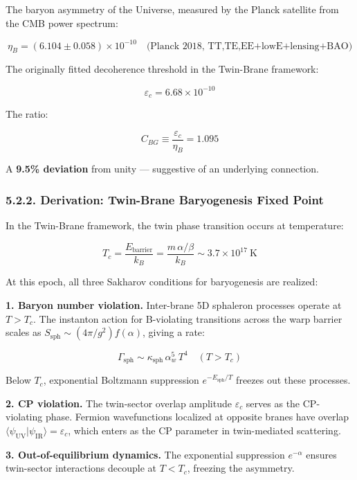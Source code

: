 \documentclass[
  11pt,
]{article}
\begin{document}
The baryon asymmetry of the Universe, measured by the Planck satellite
from the CMB power spectrum:

\[\eta_B = (6.104 \pm 0.058) \times 10^{-10} \quad \text{(Planck 2018, TT,TE,EE+lowE+lensing+BAO)} \tag{209}\]

The originally fitted decoherence threshold in the Twin-Brane framework:

\[\varepsilon_c = 6.68 \times 10^{-10} \tag{210}\]

The ratio:

\[C_{BG} \equiv \frac{\varepsilon_c}{\eta_B} = 1.095 \tag{211}\]

A \textbf{9.5\% deviation} from unity --- suggestive of an underlying
connection.

\hypertarget{derivation-twin-brane-baryogenesis-fixed-point}{%
\subsubsection{5.2.2. Derivation: Twin-Brane Baryogenesis Fixed
Point}\label{derivation-twin-brane-baryogenesis-fixed-point}}

In the Twin-Brane framework, the twin phase transition occurs at
temperature:

\[T_c = \frac{E_{\text{barrier}}}{k_B} = \frac{m\,\alpha/\beta}{k_B} \sim 3.7 \times 10^{17}~\text{K} \tag{212}\]

At this epoch, all three Sakharov conditions for baryogenesis are
realized:

\textbf{1. Baryon number violation.} Inter-brane 5D sphaleron processes
operate at \(T > T_c\). The instanton action for B-violating transitions
across the warp barrier scales as
\(S_{\text{sph}} \sim (4\pi/g^2) f(\alpha)\), giving a rate:

\[\Gamma_{\text{sph}} \sim \kappa_{\text{sph}}\,\alpha_w^5\,T^4 \quad (T > T_c) \tag{213}\]

Below \(T_c\), exponential Boltzmann suppression
\(e^{-E_{\text{sph}}/T}\) freezes out these processes.

\textbf{2. CP violation.} The twin-sector overlap amplitude
\(\varepsilon_c\) serves as the CP-violating phase. Fermion
wavefunctions localized at opposite branes have overlap
\(\langle\psi_{\text{UV}}|\psi_{\text{IR}}\rangle = \varepsilon_c\),
which enters as the CP parameter in twin-mediated scattering.

\textbf{3. Out-of-equilibrium dynamics.} The exponential suppression
\(e^{-\alpha}\) ensures twin-sector interactions decouple at
\(T < T_c\), freezing the asymmetry.
\end{document}
